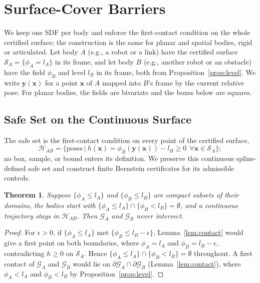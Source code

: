 \documentclass[journal]{IEEEtran}
\newtheorem{theorem}{Theorem}
\theoremstyle{definition}
\begin{document}
\section{Surface-Cover Barriers}\label{sec:cover}
We keep one SDF per body and enforce the first-contact condition on the whole certified surface; the
construction is the same for planar and spatial bodies, rigid or articulated. Let body $A$ (e.g., a
robot or a link) have the certified surface $\mathcal S_A=\{\phi_A=l_A\}$ in its frame, and let body $B$
(e.g., another robot or an obstacle) have the field $\phi_B$ and level $l_B$ in its frame, both from
Proposition~\ref{prop:level}. We write $\mathbf y(\mathbf x)$ for a point $\mathbf x$ of $A$ mapped into
$B$'s frame by the current relative pose. For planar bodies, the fields are bivariate and the boxes
below are squares.

\subsection{Safe Set on the Continuous Surface}
The safe set is the first-contact condition on every point of the certified surface,
\begin{equation}\label{eq:safe}
\mathcal H_{AB}=\big\{\text{poses}\ \big|\ h(\mathbf x)=\phi_B(\mathbf y(\mathbf x))-l_B\ge0\ \ \forall\mathbf x\in\mathcal S_A\big\};
\end{equation}
no box, sample, or bound enters its definition. We preserve this continuous spline-defined safe set
and construct finite Bernstein certificates for its admissible controls.
\begin{theorem}\label{thm:cover}
Suppose $\{\phi_A\le l_A\}$ and $\{\phi_B\le l_B\}$ are compact subsets of their domains, the bodies
start with $\{\phi_A\le l_A\}\cap\{\phi_B<l_B\}=\emptyset$, and a continuous trajectory stays in
$\mathcal H_{AB}$. Then $\mathcal G_A$ and $\mathcal G_B$ never intersect.
\end{theorem}
\begin{proof}
For $\epsilon>0$, if $\{\phi_A\le l_A\}$ met $\{\phi_B\le l_B-\epsilon\}$, Lemma~\ref{lem:contact} would
give a first point on both boundaries, where $\phi_A=l_A$ and $\phi_B=l_B-\epsilon$, contradicting
$h\ge0$ on $\mathcal S_A$. Hence $\{\phi_A\le l_A\}\cap\{\phi_B<l_B\}=\emptyset$ throughout. A first
contact of $\mathcal G_A$ and $\mathcal G_B$ would lie on $\partial\mathcal G_A\cap\partial\mathcal G_B$
(Lemma~\ref{lem:contact}), where $\phi_A<l_A$ and $\phi_B<l_B$ by Proposition~\ref{prop:level}.
\end{proof}
\end{document}
